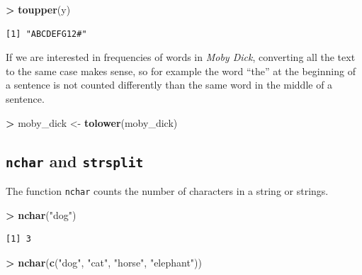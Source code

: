 \documentclass[]{krantz}
\makeatletter
\newenvironment{Shaded}{\begin{snugshade}}{\end{snugshade}}
\newcommand{\KeywordTok}[1]{\textcolor[rgb]{0.27,0.27,0.27}{\textbf{#1}}}
\newcommand{\NormalTok}[1]{#1}
\newcommand{\OperatorTok}[1]{\textcolor[rgb]{0.43,0.43,0.43}{\textbf{#1}}}
\newcommand{\StringTok}[1]{\textcolor[rgb]{0.5,0.5,0.5}{#1}}
\newenvironment{kframe}{%
\medskip{}
\setlength{\fboxsep}{.8em}
 \def\at@end@of@kframe{}%
 \ifinner\ifhmode%
  \def\at@end@of@kframe{\end{minipage}}%
  \begin{minipage}{\columnwidth}%
 \fi\fi%
 \def\FrameCommand##1{\hskip\@totalleftmargin \hskip-\fboxsep
 \colorbox{shadecolor}{##1}\hskip-\fboxsep
     \hskip-\linewidth \hskip-\@totalleftmargin \hskip\columnwidth}%
 \MakeFramed {\advance\hsize-\width
   \@totalleftmargin\z@ \linewidth\hsize
   \@setminipage}}%
 {\par\unskip\endMakeFramed%
 \at@end@of@kframe}
\renewenvironment{Shaded}{\begin{kframe}}{\end{kframe}}
\makeatother
\begin{document}
\begin{Shaded}
\begin{Highlighting}[]
\OperatorTok{>}\StringTok{ }\KeywordTok{toupper}\NormalTok{(y)}
\end{Highlighting}
\end{Shaded}

\begin{verbatim}
[1] "ABCDEFG12#"
\end{verbatim}

If we are interested in frequencies of words in \emph{Moby Dick}, converting all the text to the same case makes sense, so for example the word ``the'' at the beginning of a sentence is not counted differently than the same word in the middle of a sentence.

\begin{Shaded}
\begin{Highlighting}[]
\OperatorTok{>}\StringTok{ }\NormalTok{moby_dick <-}\StringTok{ }\KeywordTok{tolower}\NormalTok{(moby_dick)}
\end{Highlighting}
\end{Shaded}

\hypertarget{nchar-and-strsplit}{%
\subsection{\texorpdfstring{\texttt{nchar} and \texttt{strsplit}}{nchar and strsplit}}\label{nchar-and-strsplit}}

The function \texttt{nchar} counts the number of characters in a string or strings.

\begin{Shaded}
\begin{Highlighting}[]
\OperatorTok{>}\StringTok{ }\KeywordTok{nchar}\NormalTok{(}\StringTok{"dog"}\NormalTok{)}
\end{Highlighting}
\end{Shaded}

\begin{verbatim}
[1] 3
\end{verbatim}

\begin{Shaded}
\begin{Highlighting}[]
\OperatorTok{>}\StringTok{ }\KeywordTok{nchar}\NormalTok{(}\KeywordTok{c}\NormalTok{(}\StringTok{"dog"}\NormalTok{, }\StringTok{"cat"}\NormalTok{, }\StringTok{"horse"}\NormalTok{, }\StringTok{"elephant"}\NormalTok{))}
\end{Highlighting}
\end{Shaded}
\end{document}
